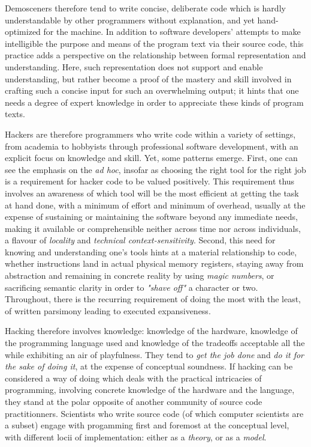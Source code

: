 Demosceners therefore tend to write concise, deliberate code which is hardly understandable by other programmers without explanation, and yet hand-optimized for the machine. In addition to software developers' attempts to make intelligible the purpose and means of the program text via their source code, this practice adds a perspective on the relationship between formal representation and understanding. Here, such representation does not support and enable understanding, but rather become a proof of the mastery and skill involved in crafting such a concise input for such an overwhelming output; it hints that one needs a degree of expert knowledge in order to appreciate these kinds of program texts.

Hackers are therefore programmers who write code within a variety of settings, from academia to hobbyists through professional software development, with an explicit focus on knowledge and skill. Yet, some patterns emerge. First, one can see the emphasis on the \emph{ad hoc}, insofar as choosing the right tool for the right job is a requirement for hacker code to be valued positively. This requirement thus involves an awareness of which tool will be the most efficient at getting the task at hand done, with a minimum of effort and minimum of overhead, usually at the expense of sustaining or maintaining the software beyond any immediate needs, making it available or comprehensible neither across time nor across individuals, a flavour of \emph{locality} and \emph{technical context-sensitivity}. Second, this need for knowing and understanding one's tools hints at a material relationship to code, whether instructions land in actual physical memory registers, staying away from abstraction and remaining in concrete reality by using \emph{magic numbers}, or sacrificing semantic clarity in order to \emph{"shave off"} a character or two. Throughout, there is the recurring requirement of doing the most with the least, of written parsimony leading to executed expansiveness.

Hacking therefore involves knowledge: knowledge of the hardware, knowledge of the programming language used and knowledge of the tradeoffs acceptable all the while exhibiting an air of playfulness. They tend to \emph{get the job done} and \emph{do it for the sake of doing it}, at the expense of conceptual soundness. If hacking can be considered a way of doing which deals with the practical intricacies of programming, involving concrete knowledge of the hardware and the language, they stand at the polar opposite of another community of source code practitionners. Scientists who write source code (of which computer scientists are a subset) engage with progamming first and foremost at the conceptual level, with different locii of implementation: either as a \emph{theory}, or as a \emph{model}.

